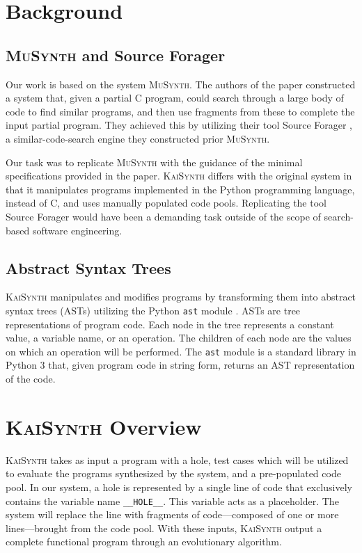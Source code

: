 \documentclass{article}
\begin{document}
\section{Background}
\subsection{\textsc{MuSynth} and Source Forager}
Our work is based on the system \textsc{MuSynth}. The authors of the paper constructed a system that, given a partial C program, could search through a large body of code to find similar programs, and then use fragments from these to complete the input partial program. They achieved this by utilizing their tool Source Forager \cite{sourceforager}, a similar-code-search engine they constructed prior \textsc{MuSynth}.

Our task was to replicate \textsc{MuSynth} with the guidance of the minimal specifications provided in the paper. \textsc{KaiSynth} differs with the original system in that it manipulates programs implemented in the Python programming language, instead of C, and uses manually populated code pools. Replicating the tool Source Forager would have been a demanding task outside of the scope of search-based software engineering.

\subsection{Abstract Syntax Trees}
\textsc{KaiSynth} manipulates and modifies programs by transforming them into abstract syntax trees (ASTs) utilizing the Python \texttt{ast} module \cite{astpython}. ASTs are tree representations of program code. Each node in the tree represents a constant value, a variable name, or an operation. The children of each node are the values on which an operation will be performed.  The \texttt{ast} module is a standard library in Python 3 that, given program code in string form, returns an AST representation of the code.


\section{\textsc{KaiSynth} Overview}

\textsc{KaiSynth} takes as input a program with a hole, test cases which will be utilized to evaluate the programs synthesized by the system, and a pre-populated code pool. In our system, a hole is represented by a single line of code that exclusively contains the variable name \texttt{\_\_HOLE\_\_}. This variable acts as a placeholder. The system will replace the line with fragments of code---composed of one or more lines---brought from the code pool. With these inputs, \textsc{KaiSynth} output a complete functional program through an evolutionary algorithm.
\end{document}
